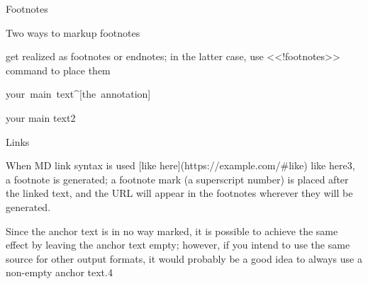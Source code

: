 {\mktsHThree{}Footnotes\mktsHThreeBeg}%

\vspace{\parskip}%
\begin{multicols}{2}\raggedcolumns{}Two ways to markup footnotes

get realized as footnotes or endnotes; in the latter case, use {\mktsStyleCode{}<<!\allowbreak{}footnotes>>}
command to place them

\null\par{\mktsTightParagraphs{}

{\mktsStyleCode{}your main text\textasciicircum{}[the annotation]\par
}

}your main text{\mktsEnStyleMarkMain{}2}


\end{multicols}

{\mktsHThree{}Links\mktsHThreeBeg}%

\vspace{\parskip}%
\begin{multicols}{2}\raggedcolumns{}When MD link syntax is used {\mktsStyleCode{}[like \allowbreak{}here]\allowbreak{}(https://\allowbreak{}example.com/\allowbreak{}\#like)}
{\mktsStyleLinklabel{}like here}{\mktsEnStyleMarkMain{}3}, a footnote is generated; a footnote mark
(a superscript number) is placed after the linked text, and the URL will appear in
the footnotes wherever they will be generated.

Since the anchor text is in no way
marked, it is possible to achieve the same effect by leaving the anchor text
empty; however, if you intend to use the same source for other output formats,
it would probably be a good idea to always use a non-empty anchor text.{\mktsEnStyleMarkMain{}4}

\end{multicols}

